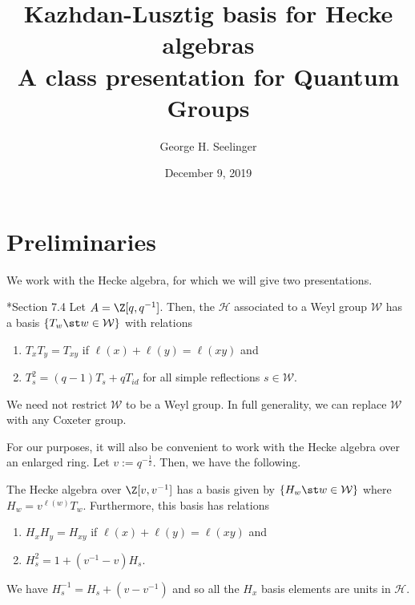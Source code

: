 \documentclass[11pt,leqno,oneside]{amsart}
\title[Kazhdan-Lusztig Basis]{Kazhdan-Lusztig basis for Hecke algebras
  \\ A class presentation for Quantum Groups}
\author{George H. Seelinger}
\date{December 9, 2019}
\numberwithin{thm}{section}
\renewcommand{\W}{\mathcal{W}}
\renewcommand{\H}{\mathcal{H}} %
\begin{document}
\maketitle
\section{Preliminaries}
We work with the Hecke algebra, for which we will give two
presentations.
\begin{defn}
  \cite{humphreys}*{Section 7.4} Let \(A = \Z[q,q^{-1}]\). Then, the
   \(\H\) associated to 
  a Weyl group \(\W\) has a basis \(\{T_w \st w \in \W\}\) with
  relations
  \begin{enumerate}
  \item \(T_x T_y = T_{xy}\) if \(\ell(x) + \ell(y) = \ell(xy)\) and
  \item \(T_s^2 = (q-1)T_s + qT_{id}\) for all simple reflections \(s
    \in \W\).
  \end{enumerate}
\end{defn}
\begin{rmk}
  We need not restrict \(\W\) to be a Weyl group. In full generality,
  we can replace \(\W\) with any Coxeter group.
\end{rmk}
For our purposes, it will also be convenient to work with the Hecke
algebra over an enlarged ring. Let \(v := q^{-\frac{1}{2}}\). Then, we
have the following.
\begin{prop}\label{H-basis}
  The Hecke algebra over \(\Z[v,v^{-1}]\) has a basis given by \(\{H_w
  \st w \in \W\}\) where \(H_w = v^{\ell(w)} T_w\). Furthermore, this
  basis has relations
  \begin{enumerate}
  \item \(H_x H_y = H_{xy}\) if \(\ell(x)+\ell(y) = \ell(xy)\) and
  \item \(H_s^2 = 1 + (v^{-1}-v)H_s\). 
  \end{enumerate}
\end{prop}
\begin{lem}
  We have \(H_s^{-1} = H_s + (v-v^{-1})\) and so all the \(H_x\) basis
  elements are units in \(\H\).
\end{lem}
\end{document}
